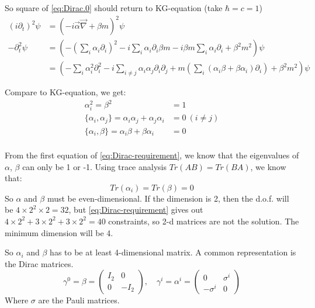 So square of \ref{eq:Dirac.0} should return to KG-equation (take $\hbar = c = 1$)
\begin{equation}
    \begin{aligned}
	(i\partial_t)^2\psi &= (-i\vec{\alpha}\vec{\nabla} + \beta m)^2 \psi  \\
	-\partial_t^2 \psi &= (-(\sum_i \alpha_i \partial_i)^2 - i\sum_i \alpha_i \partial_i \beta m - i\beta m \sum_i \alpha_i \partial_i + \beta^2m^2 ) \psi	\\
	    &= (-\sum_i \alpha_i^2\partial_i^2 - i\sum_{i \ne j}\alpha_i\alpha_j \partial_i\partial_j
	      + m (\sum_i (\alpha_i\beta + \beta\alpha_i) \partial_i) + \beta^2 m^2) \psi
    \end{aligned}
\end{equation}

Compare to KG-equation, we get:
\begin{equation}
    \begin{aligned}
	\alpha_i^2 = \beta^2 &= 1   \\
	\{\alpha_i, \alpha_j\} = \alpha_i\alpha_j + \alpha_j \alpha_i &= 0 \ (i \ne j)\\
	\{\alpha_i, \beta\} = \alpha_i\beta + \beta \alpha_i &= 0	\\
    \end{aligned}
    \label{eq:Dirac-requirement}
\end{equation}

From the first equation of \ref{eq:Dirac-requirement}, we know that the eigenvalues
of $\alpha$, $\beta$ can only be 1 or -1. Using trace analysis $ Tr(AB) = Tr(BA)$, 
we know that:
$$ Tr(\alpha_i) = Tr(\beta) = 0 $$
So $\alpha$ and $\beta$ must be even-dimensional. If the dimension is 2, then
the d.o.f. will be $4 \times 2^2 \times 2 = 32$, but \ref{eq:Dirac-requirement} 
gives out $4\times 2^2 + 3\times 2^2 + 3\times 2^2 = 40$ constraints, so 2-d matrices
are not the solution. The minimum dimension will be 4.

So $\alpha_i$ and $\beta$ has to be at least 4-dimensional matrix.
A common representation is the Dirac matrices.
\begin{equation}
    \gamma^0 = \beta = \begin{pmatrix} I_2 & 0 \\ 0 & -I_2 \end{pmatrix}, \quad
    \gamma^i = \alpha^i = \begin{pmatrix} 0 & \sigma^i \\ -\sigma^i & 0 \end{pmatrix}
\end{equation}
Where $\sigma$ are the Pauli matrices.

